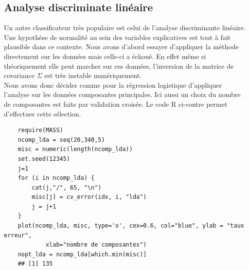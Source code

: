 \documentclass[12pt,a4paper]{article}
\begin{document}
\subsection{Analyse discriminate linéaire}
Un autre classificateur très populaire est celui de l'analyse discriminante linéaire. Une hypothèse de normalité au sein des variables explicatives est tout à fait plausible dans ce contexte. Nous avons d'abord essayer d'appliquer la méthode directement sur les données mais celle-ci a échoué. En effet même si théoriquement elle peut marcher sur ces données, l'inversion de la matrice de covariance $\Sigma$ est très instable numériquement.\\
Nous avons donc décider comme pour la régression logistique d'appliquer l'analyse sur les données composantes principales. Ici aussi un choix du nombre de composantes est faits par validation croisée. Le code R ci-contre permet d'effectuer cette sélection.\vspace{2mm}
\begin{lstlisting}
	require(MASS)
	ncomp_lda = seq(20,340,5)
	misc = numeric(length(ncomp_lda))
	set.seed(12345)
	j=1
	for (i in ncomp_lda) {
		cat(j,"/", 65, "\n")
		misc[j] = cv_error(idx, i, "lda")
		j = j+1
	}
	plot(ncomp_lda, misc, type='o', cex=0.6, col="blue", ylab = "taux erreur",
			xlab="nombre de composantes")
	nopt_lda = ncomp_lda[which.min(misc)]
	## [1] 135
\end{lstlisting}
\end{document}
